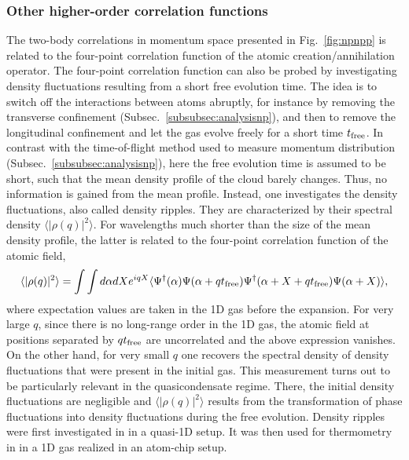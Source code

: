 \documentclass[onecolumn,amsfonts,showpacs,superscriptaddress]{revtex4-1}
\begin{document}
\subsubsection{Other higher-order correlation functions}
The two-body correlations in momentum space presented in Fig.~\ref{fig:npnpp} is related to the four-point correlation function of the atomic creation/annihilation operator. 
The four-point correlation function can also be probed by investigating density fluctuations resulting from a short free evolution time. The idea is to switch off the interactions between atoms abruptly, for instance by removing the transverse confinement (Subsec.~\ref{subsubsec:analysisnp}), and then to remove the longitudinal confinement and let the gas evolve freely for a short time $t_{{\rm free}}$. 
In contrast with the time-of-flight method used to measure momentum distribution (Subsec.~\ref{subsubsec:analysisnp}), here the free evolution time is assumed to be short, such that the mean density profile of the cloud barely changes.
Thus, no information is gained from the mean profile. Instead, one investigates the density fluctuations, also called density ripples. They are characterized by their spectral density $\langle |\rho(q)|^2\rangle$. 
For wavelengths much shorter than the size of the mean density profile, the latter is
related to the four-point correlation function
of the atomic field, 
\begin{equation}
    \langle |\rho (q)|^2\rangle = \int \int d\alpha dX e^{iqX}\langle \Psi^\dagger (\alpha) \Psi(\alpha+q t_{{\rm free}}) \Psi^\dagger (\alpha+X+q t_{{\rm free}}) \Psi(\alpha +X)\rangle ,
    \label{eq:densityripples}
\end{equation}
where expectation values are taken in the 1D gas before the expansion.
For very large $q$, since there is no long-range order in the 1D gas, the atomic field at positions separated by $q t_{{\rm free}}$ are uncorrelated and the above expression
vanishes.  On the other hand, for very small $q$ one recovers the 
spectral density of density fluctuations that were present in the initial gas.
This measurement turns out to be 
particularly relevant in the quasicondensate regime. There, the initial density fluctuations are negligible and  $\langle |\rho(q)|^2\rangle$ results from the 
transformation of phase fluctuations into density fluctuations during the free evolution.
Density ripples were first 
investigated in \citep{dettmer_observation_2001} in a quasi-1D setup. It was then used for thermometry in \citep{manz_two-point_2010} in a 1D gas realized in an atom-chip setup.
\end{document}
